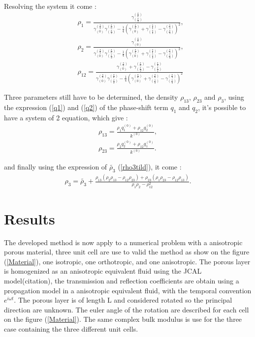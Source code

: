 \documentclass{article}
\begin{document}
    Resolving the system it come :
    \begin{align}
        &\rho_1=\frac{\gamma^{(\frac{\pi}{6})}_{(\frac{\pi}{2})}}{\gamma^{(\frac{\pi}{6})}_{(0)}\gamma^{(\frac{\pi}{6})}_{(\frac{\pi}{2})}-\frac{1}{4}(\gamma^{(\frac{\pi}{6})}_{(0)}+\gamma^{(\frac{\pi}{6})}_{(\frac{\pi}{2})}-\gamma^{(\frac{\pi}{4})}_{(\frac{\pi}{4})})^2},\\
        &\rho_2=\frac{\gamma^{(\frac{\pi}{6})}_{(0)}}{\gamma^{(\frac{\pi}{6})}_{(0)}\gamma^{(\frac{\pi}{6})}_{(\frac{\pi}{2})}-\frac{1}{4}(\gamma^{(\frac{\pi}{6})}_{(0)}+\gamma^{(\frac{\pi}{6})}_{(\frac{\pi}{2})}-\gamma^{(\frac{\pi}{4})}_{(\frac{\pi}{4})})^2},\\
        &\rho_{12}=\frac{\gamma^{(\frac{\pi}{6})}_{(0)}+\gamma^{(\frac{\pi}{6})}_{(\frac{\pi}{2})}-\gamma^{(\frac{\pi}{4})}_{(\frac{\pi}{4})}}{\gamma^{(\frac{\pi}{6})}_{(0)}\gamma^{(\frac{\pi}{6})}_{(\frac{\pi}{2})}-\frac{1}{4}(\gamma^{(\frac{\pi}{6})}_{(0)}+\gamma^{(\frac{\pi}{6})}_{(\frac{\pi}{2})}-\gamma^{(\frac{\pi}{4})}_{(\frac{\pi}{4})})^2}
    \end{align}
    
    Three parameters still have to be determined, the density $\rho_{13}$, $\rho_{23}$ and $\rho_3$, using the expression (\ref{q1}) and (\ref{q2}) of the phase-shift term $q_1$ and $q_2$, it's possible to have a system of 2 equation, which give :
    \begin{align}
    \rho_{13}=\frac{\rho_1q_1^{(0)}+\rho_{12}q_2^{(0)}}{k^{(0)}},\\
    \rho_{23}=\frac{\rho_2q_2^{(0)}+\rho_{12}q_1^{(0)}}{k^{(0)}}.
    \end{align}
    
    and finally using the expression of $\tilde{\rho_3}$ (\ref{rho3tild}), it come :
    \begin{align}
    \rho_3=\tilde{\rho_3}+\frac{\rho_{13}(\rho_2\rho_{13}-\rho_{12}\rho_{23})+\rho_{23}(\rho_1\rho_{23}-\rho_{12}\rho_{13})}{\rho_1\rho_2-\rho_{12}^2}.
    \end{align}

    
\section{Results}
    The developed method is now apply to a numerical problem with a anisotropic porous material, three unit cell are use to valid the method as show on the figure (\ref{Material}), one isotropic, one orthotropic, and one anisotropic. The porous layer is homogenized as an anisotropic equivalent fluid using the JCAL model(citation), the transmission and reflection coefficients are obtain using a propagation model in a anisotropic equivalent fluid, with the temporal convention $e^{i\omega t}$. The porous layer is of length L and considered rotated so the principal direction are unknown. The euler angle of the rotation are described for each cell on the figure (\ref{Material}). The same complex bulk modulus is use for the three case containing the three different unit cells. 
\end{document}
